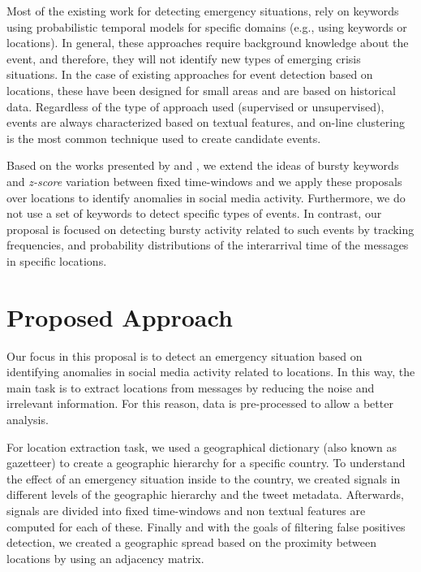 \documentclass[sigconf]{acmart}
\begin{document}
\medskip

 Most of the existing work for detecting emergency situations, rely on keywords using probabilistic temporal models for specific domains (e.g., using keywords or locations). In general, these approaches require background knowledge about the event, and therefore, they will not identify new types of emerging crisis situations. In the case of existing approaches for event detection based on locations, these have been designed for small areas and are based on historical data. Regardless of the type of approach used (supervised or unsupervised), events are always characterized based on textual features, and on-line clustering is the most common technique used to create candidate events.

Based on the works presented by \citeauthor{guzman2013line} \cite{guzman2013line} and \citeauthor{maldonado2017} \cite{maldonado2017}, we extend the ideas of bursty keywords and \textit{z-score} variation between fixed time-windows and we apply these proposals over locations to identify anomalies in social media activity. Furthermore, we do not use a set of keywords to detect specific types of events. In contrast, our proposal is focused on detecting bursty activity related to such events by tracking frequencies, and probability distributions of the interarrival time of the messages in specific locations.



\section{Proposed Approach}

Our focus in this proposal is to detect an emergency situation based on identifying anomalies in social media activity related to locations. In this way, the main task is to extract locations from messages by reducing the noise and irrelevant information. For this reason, data is pre-processed to allow a better analysis.

For location extraction task, we used a geographical dictionary (also known as gazetteer) to create a geographic hierarchy for a specific country. To understand the effect of an emergency situation inside to the country, we created signals in different levels of the geographic hierarchy and the tweet metadata. Afterwards, signals are divided into fixed time-windows and non textual features are computed for each of these. Finally and with the goals of filtering false positives detection, we created a geographic spread based on the proximity between locations by using an adjacency matrix.
\end{document}

